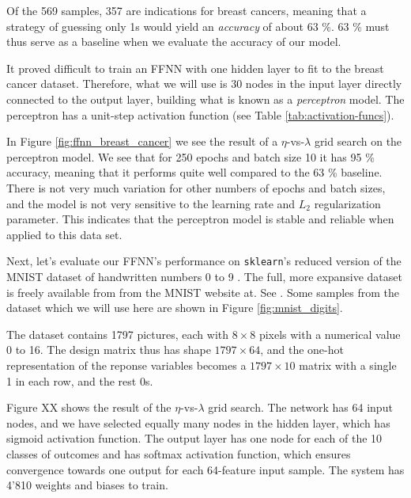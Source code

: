 \documentclass[]{article}
\begin{document}
Of the 569 samples, 357 are  indications for breast cancers, meaning that a strategy of guessing only 1s would yield an \textit{accuracy} of about 63 \%. 63 \% must thus serve as a baseline when we evaluate the accuracy of our model.

It proved difficult to train an FFNN with one hidden layer to fit to the breast cancer dataset. Therefore, what we will use is 30 nodes in the input layer directly connected to the output layer, building what is known as a \textit{perceptron} model. The perceptron has a unit-step activation function (see Table \ref{tab:activation-funcs}).

In Figure \ref{fig:ffnn_breast_cancer} we see the result of a $\eta$-vs-$\lambda$ grid search on the perceptron model. We see that for 250 epochs and batch size 10 it has 95 \% accuracy, meaning that it performs quite well compared to the 63 \% baseline. There is not very much variation for other numbers of epochs and batch sizes, and the model is not very sensitive to the learning rate and $L_2$ regularization parameter. This indicates that the perceptron model is stable and reliable when applied to this data set.

\vspace{5mm}

Next, let's evaluate our FFNN's performance on \lstinline|sklearn|'s reduced version of the MNIST dataset of handwritten numbers 0 to 9 \cite{skl-datasets}. The full, more expansive dataset is freely available from from the MNIST website at. See \cite{mnist}. Some samples from the dataset which we will use here are shown in Figure \ref{fig:mnist_digits}. 

The dataset contains 1797 pictures, each with $8 \times 8$ pixels with a numerical value 0 to 16. The design matrix thus has shape $1797 \times 64$, and the one-hot representation of the reponse variables becomes a $1797 \times 10$ matrix with a single 1 in each row, and the rest 0s.

Figure XX shows the result of the $\eta$-vs-$\lambda$ grid search. The network has 64 input nodes, and we have selected equally many nodes in the hidden layer, which has sigmoid activation function. The output layer has one node for each of the 10 classes of outcomes and has softmax activation function, which ensures convergence towards one output for each 64-feature input sample. The system has 4'810 weights and biases to train.
\end{document}
